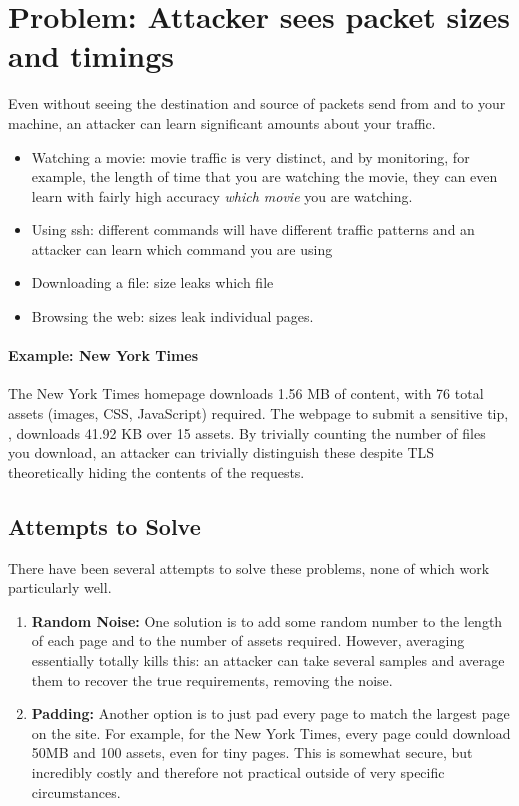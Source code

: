 \section{Problem: Attacker sees packet sizes and timings}
Even without seeing the destination and source of packets send from and to your machine, an attacker can learn significant amounts about your traffic.
\begin{itemize}
	\item Watching a movie: movie traffic is very distinct, and by monitoring, for example, the length of time that you are watching the movie, they can even learn with fairly high accuracy \emph{which movie} you are watching.
	\item Using ssh: different commands will have different traffic patterns and an attacker can learn which command you are using
	\item Downloading a file: size leaks which file
	\item Browsing the web: sizes leak individual pages.
\end{itemize}

\paragraph{Example: New York Times} The New York Times homepage  downloads 1.56 MB of content, with 76 total assets (images, CSS, JavaScript) required. The webpage to submit a sensitive tip, , downloads 41.92 KB over 15 assets. By trivially counting the number of files you download, an attacker can trivially distinguish these despite TLS theoretically hiding the contents of the requests.

\subsection{Attempts to Solve}
There have been several attempts to solve these problems, none of which work particularly well. 

\begin{enumerate}
	\item \textbf{Random Noise:} One solution is to add some random number to the length of each page and to the number of assets required. However, averaging essentially totally kills this: an attacker can take several samples and average them to recover the true requirements, removing the noise. 
\item \textbf{Padding:} Another option is to just pad every page to match the largest page on the site. For example, for the New York Times, every page could download 50MB and 100 assets, even for tiny pages. This is somewhat secure, but incredibly costly and therefore not practical outside of very specific circumstances.
\end{enumerate}

